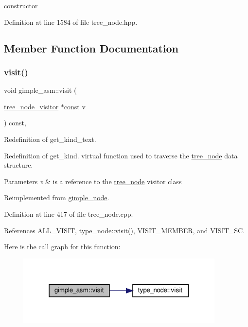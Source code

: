 constructor 



Definition at line 1584 of file tree\+\_\+node.\+hpp.



\subsection{Member Function Documentation}
\mbox{\label{structgimple__asm_ac2ba4ccbf1f1085bcf1e0c9d6c06d706}} 
\subsubsection{\texorpdfstring{visit()}{visit()}}
{\footnotesize\ttfamily void gimple\+\_\+asm\+::visit (\begin{DoxyParamCaption}\item[{\hyperlink{classtree__node__visitor}{tree\+\_\+node\+\_\+visitor} $\ast$const}]{v }\end{DoxyParamCaption}) const\hspace{0.3cm}{\ttfamily [override]}, {\ttfamily [virtual]}}



Redefinition of get\+\_\+kind\+\_\+text. 

Redefinition of get\+\_\+kind. virtual function used to traverse the \hyperlink{classtree__node}{tree\+\_\+node} data structure. 
\begin{DoxyParams}{Parameters}
{\em v} & is a reference to the \hyperlink{classtree__node}{tree\+\_\+node} visitor class \\
\hline
\end{DoxyParams}


Reimplemented from \hyperlink{structgimple__node_a337b029a3aca9c1b96311b6e6668f7f3}{gimple\+\_\+node}.



Definition at line 417 of file tree\+\_\+node.\+cpp.



References A\+L\+L\+\_\+\+V\+I\+S\+IT, type\+\_\+node\+::visit(), V\+I\+S\+I\+T\+\_\+\+M\+E\+M\+B\+ER, and V\+I\+S\+I\+T\+\_\+\+SC.

Here is the call graph for this function\+:
\nopagebreak
\begin{figure}[H]
\begin{center}
\leavevmode
\includegraphics[width=295pt]{de/d23/structgimple__asm_ac2ba4ccbf1f1085bcf1e0c9d6c06d706_cgraph}
\end{center}
\end{figure}


